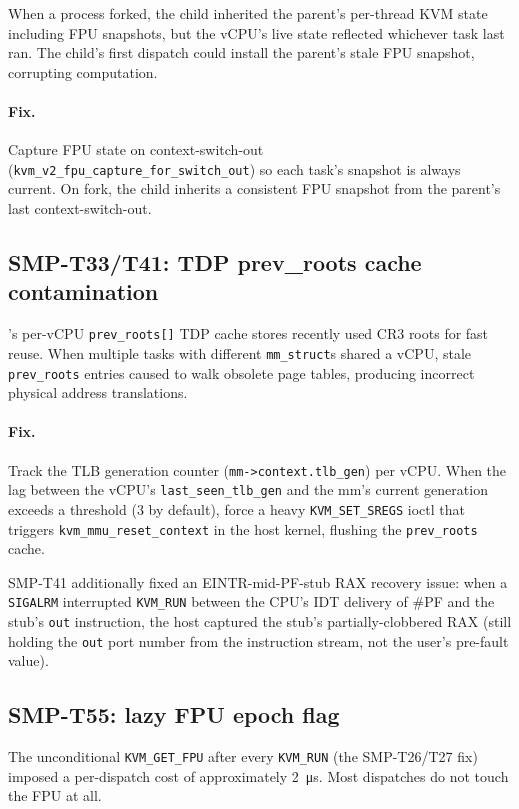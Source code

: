 When a \UML{} process forked, the child inherited the parent's per-thread
KVM state including FPU snapshots, but the vCPU's live state reflected
whichever task last ran.  The child's first dispatch could install the
parent's stale FPU snapshot, corrupting computation.

\paragraph{Fix.}
Capture FPU state on context-switch-out
(\texttt{kvm\_v2\_fpu\_capture\_for\_switch\_out}) so each task's snapshot is
always current.  On fork, the child inherits a consistent FPU snapshot from
the parent's last context-switch-out.

\subsection{SMP-T33/T41: TDP prev\_roots cache contamination}

\KVM{}'s per-vCPU \texttt{prev\_roots[]} TDP cache stores recently used
CR3 roots for fast reuse.  When multiple \UML{} tasks with different
\texttt{mm\_struct}s shared a vCPU, stale \texttt{prev\_roots} entries
caused \KVM{} to walk obsolete page tables, producing incorrect physical
address translations.

\paragraph{Fix.}
Track the TLB generation counter (\texttt{mm->context.tlb\_gen}) per vCPU.
When the lag between the vCPU's \texttt{last\_seen\_tlb\_gen} and the mm's
current generation exceeds a threshold (3 by default), force a heavy
\texttt{KVM\_SET\_SREGS} ioctl that triggers
\texttt{kvm\_mmu\_reset\_context} in the host kernel, flushing the
\texttt{prev\_roots} cache.

SMP-T41 additionally fixed an EINTR-mid-PF-stub RAX recovery issue: when a
\texttt{SIGALRM} interrupted \texttt{KVM\_RUN} between the CPU's IDT
delivery of \#PF and the stub's \texttt{out} instruction, the host captured
the stub's partially-clobbered RAX (still holding the \texttt{out} port
number from the instruction stream, not the user's pre-fault value).

\subsection{SMP-T55: lazy FPU epoch flag}

The unconditional \texttt{KVM\_GET\_FPU} after every \texttt{KVM\_RUN}
(the SMP-T26/T27 fix) imposed a per-dispatch cost of approximately
\SI{2}{\micro\second}.  Most dispatches do not touch the FPU at all.

